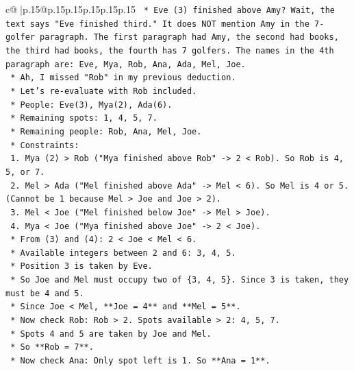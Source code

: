 \documentclass{article}
\begin{document}
{\begin{supertabular}{c@{$\;$}|p{.15\linewidth}@{}p{.15\linewidth}p{.15\linewidth}p{.15\linewidth}p{.15\linewidth}p{.15\linewidth}}
{{{\texttt{                    *   Eve (3) finished above Amy? Wait, the text says "Eve finished third." It does NOT mention Amy in the 7{-}golfer paragraph. The first paragraph had Amy, the second had books, the third had books, the fourth has 7 golfers. The names in the 4th paragraph are: Eve, Mya, Rob, Ana, Ada, Mel, Joe.} \\
\texttt{                    *   Ah, I missed "Rob" in my previous deduction.} \\
\texttt{                    *   Let's re{-}evaluate with Rob included.} \\
\texttt{                    *   People: Eve(3), Mya(2), Ada(6).} \\
\texttt{                    *   Remaining spots: 1, 4, 5, 7.} \\
\texttt{                    *   Remaining people: Rob, Ana, Mel, Joe.} \\
\texttt{                    *   Constraints:} \\
\texttt{                        1.  Mya (2) > Rob ("Mya finished above Rob" {-}> 2 < Rob). So Rob is 4, 5, or 7.} \\
\texttt{                        2.  Mel > Ada ("Mel finished above Ada" {-}> Mel < 6). So Mel is 4 or 5. (Cannot be 1 because Mel > Joe and Joe > 2).} \\
\texttt{                        3.  Mel < Joe ("Mel finished below Joe" {-}> Mel > Joe).} \\
\texttt{                        4.  Mya < Joe ("Mya finished above Joe" {-}> 2 < Joe).} \\
\texttt{                    *   From (3) and (4): 2 < Joe < Mel < 6.} \\
\texttt{                    *   Available integers between 2 and 6: 3, 4, 5.} \\
\texttt{                    *   Position 3 is taken by Eve.} \\
\texttt{                    *   So Joe and Mel must occupy two of \{3, 4, 5\}. Since 3 is taken, they must be 4 and 5.} \\
\texttt{                    *   Since Joe < Mel, **Joe = 4** and **Mel = 5**.} \\
\texttt{                    *   Now check Rob: Rob > 2. Spots available > 2: 4, 5, 7.} \\
\texttt{                    *   Spots 4 and 5 are taken by Joe and Mel.} \\
\texttt{                    *   So **Rob = 7**.} \\
\texttt{                    *   Now check Ana: Only spot left is 1. So **Ana = 1**.} \\
}}}
\end{supertabular}}
\end{document}

